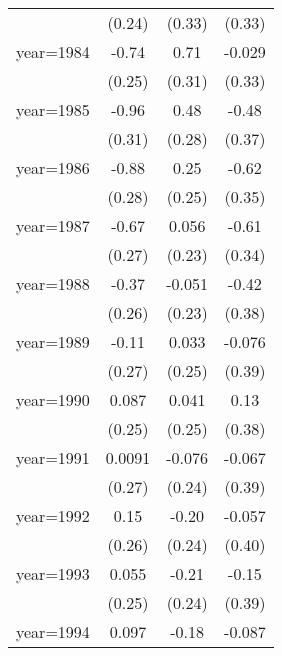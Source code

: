 \begin{sidewaystable}[htbp]
\begin{tabular}{l*{3}{c}}
                &   (0.24)         &   (0.33)         &   (0.33)         \\
\addlinespace
year=1984       &    -0.74\sym{***}&     0.71\sym{**} &   -0.029         \\
                &   (0.25)         &   (0.31)         &   (0.33)         \\
\addlinespace
year=1985       &    -0.96\sym{***}&     0.48\sym{*}  &    -0.48         \\
                &   (0.31)         &   (0.28)         &   (0.37)         \\
\addlinespace
year=1986       &    -0.88\sym{***}&     0.25         &    -0.62\sym{*}  \\
                &   (0.28)         &   (0.25)         &   (0.35)         \\
\addlinespace
year=1987       &    -0.67\sym{**} &    0.056         &    -0.61\sym{*}  \\
                &   (0.27)         &   (0.23)         &   (0.34)         \\
\addlinespace
year=1988       &    -0.37         &   -0.051         &    -0.42         \\
                &   (0.26)         &   (0.23)         &   (0.38)         \\
\addlinespace
year=1989       &    -0.11         &    0.033         &   -0.076         \\
                &   (0.27)         &   (0.25)         &   (0.39)         \\
\addlinespace
year=1990       &    0.087         &    0.041         &     0.13         \\
                &   (0.25)         &   (0.25)         &   (0.38)         \\
\addlinespace
year=1991       &   0.0091         &   -0.076         &   -0.067         \\
                &   (0.27)         &   (0.24)         &   (0.39)         \\
\addlinespace
year=1992       &     0.15         &    -0.20         &   -0.057         \\
                &   (0.26)         &   (0.24)         &   (0.40)         \\
\addlinespace
year=1993       &    0.055         &    -0.21         &    -0.15         \\
                &   (0.25)         &   (0.24)         &   (0.39)         \\
\addlinespace
year=1994       &    0.097         &    -0.18         &   -0.087         \\

\end{tabular}
\end{sidewaystable}
